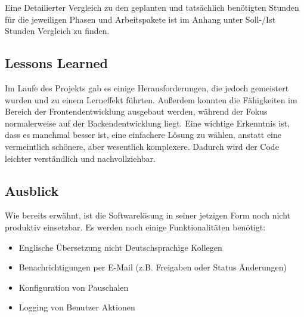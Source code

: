 Eine Detailierter Vergleich zu den geplanten und tatsächlich benötigten Stunden für die jeweiligen Phasen und Arbeitspakete ist im Anhang unter Soll-/Ist Stunden Vergleich zu finden. \todo

\subsection{Lessons Learned}

Im Laufe des Projekts gab es einige Herausforderungen, die jedoch gemeistert wurden und zu einem Lerneffekt führten. Außerdem konnten die Fähigkeiten im Bereich der Frontendentwicklung ausgebaut werden, während der Fokus normalerweise auf der Backendentwicklung liegt. Eine wichtige Erkenntnis ist, dass es manchmal besser ist, eine einfachere Lösung zu wählen, anstatt eine vermeintlich schönere, aber wesentlich komplexere. Dadurch wird der Code leichter verständlich und nachvollziehbar.

\subsection{Ausblick}

Wie bereits erwähnt, ist die Softwarelösung in seiner jetzigen Form noch nicht produktiv einsetzbar. Es werden noch einige Funktionalitäten benötigt:

\begin{itemize}
    \item Englische Übersetzung nicht Deutschsprachige Kollegen
    \item Benachrichtigungen per E-Mail (z.B. Freigaben oder Status Änderungen)
    \item Konfiguration von Pauschalen
    \item Logging von Benutzer Aktionen
\end{itemize}
